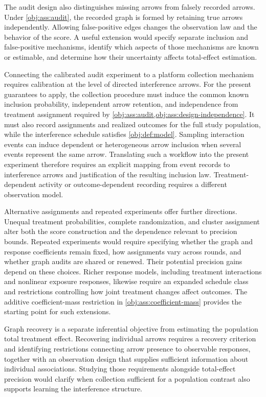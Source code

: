 \documentclass[11pt]{article}
\begin{document}
The audit design also distinguishes missing arrows from falsely recorded arrows. Under \cref{obj:ass:audit}, the recorded graph is formed by retaining true arrows independently. Allowing false-positive edges changes the observation law and the behavior of the score. A useful extension would specify separate inclusion and false-positive mechanisms, identify which aspects of those mechanisms are known or estimable, and determine how their uncertainty affects total-effect estimation.

Connecting the calibrated audit experiment to a platform collection mechanism requires calibration at the level of directed interference arrows. For the present guarantees to apply, the collection procedure must induce the common known inclusion probability, independent arrow retention, and independence from treatment assignment required by \cref{obj:ass:audit,obj:ass:design-independence}. It must also record assignments and realized outcomes for the full study population, while the interference schedule satisfies \cref{obj:def:model}. Sampling interaction events can induce dependent or heterogeneous arrow inclusion when several events represent the same arrow. Translating such a workflow into the present experiment therefore requires an explicit mapping from event records to interference arrows and justification of the resulting inclusion law. Treatment-dependent activity or outcome-dependent recording requires a different observation model.

Alternative assignments and repeated experiments offer further directions. Unequal treatment probabilities, complete randomization, and cluster assignment alter both the score construction and the dependence relevant to precision bounds. Repeated experiments would require specifying whether the graph and response coefficients remain fixed, how assignments vary across rounds, and whether graph audits are shared or renewed. Their potential precision gains depend on these choices. Richer response models, including treatment interactions and nonlinear exposure responses, likewise require an expanded schedule class and restrictions controlling how joint treatment changes affect outcomes. The additive coefficient-mass restriction in \cref{obj:ass:coefficient-mass} provides the starting point for such extensions.

Graph recovery is a separate inferential objective from estimating the population total treatment effect. Recovering individual arrows requires a recovery criterion and identifying restrictions connecting arrow presence to observable responses, together with an observation design that supplies sufficient information about individual associations. Studying those requirements alongside total-effect precision would clarify when collection sufficient for a population contrast also supports learning the interference structure.
\end{document}
